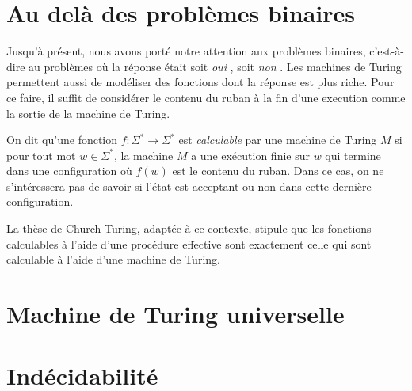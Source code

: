 \section{Au delà des problèmes binaires}

Jusqu'à présent, nous avons porté notre attention aux problèmes binaires, c'est-à-dire au problèmes où la réponse était soit \og \textit{oui} \fg{}, soit \og \textit{non} \fg{}.
Les machines de Turing permettent aussi de modéliser des fonctions dont la réponse est plus riche.
Pour ce faire, il suffit de considérer le contenu du ruban à la fin d'une execution comme la sortie de la machine de Turing.

On dit qu'une fonction $f : \Sigma^* \to \Sigma^*$ est \og \textit{calculable} \fg{} par une machine de Turing $M$ si pour tout mot $w \in \Sigma^*$, la machine $M$ a une exécution finie sur $w$ qui termine dans une configuration où $f(w)$ est le contenu du ruban.
Dans ce cas, on ne s'intéressera pas de savoir si l'état est acceptant ou non dans cette dernière configuration.

La thèse de Church-Turing, adaptée à ce contexte, stipule que les fonctions calculables à l'aide d'une procédure effective sont exactement celle qui sont calculable à l'aide d'une machine de Turing.

\section{Machine de Turing universelle}

\section{Indécidabilité}
